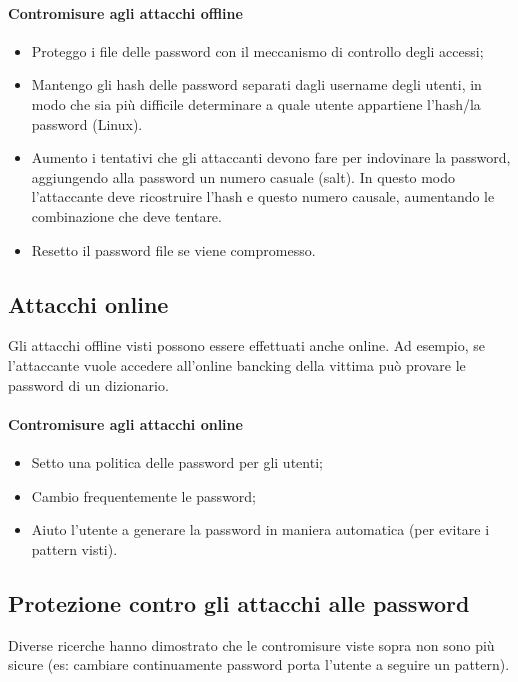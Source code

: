 \paragraph{Contromisure agli attacchi offline}
\begin{itemize}
    \item Proteggo i file delle password con il meccanismo di controllo degli accessi;
    \item Mantengo gli hash delle password separati dagli username degli utenti, in modo che sia più difficile determinare a quale utente appartiene l'hash/la password (Linux).
    \item Aumento i tentativi che gli attaccanti devono fare per indovinare la password, aggiungendo alla password un numero casuale (salt). In questo modo l'attaccante deve ricostruire l'hash e questo numero causale, aumentando le combinazione che deve tentare.
    \item Resetto il password file se viene compromesso.
\end{itemize}

\subsection{Attacchi online}
Gli attacchi offline visti possono essere effettuati anche online. Ad esempio, se l'attaccante vuole accedere all'online bancking della vittima può provare le password di un dizionario.

\paragraph{Contromisure agli attacchi online}
\begin{itemize}
    \item Setto una politica delle password per gli utenti;
    \item Cambio frequentemente le password;
    \item Aiuto l'utente a generare la password in maniera automatica (per evitare i pattern visti).
\end{itemize}

\subsection{Protezione contro gli attacchi alle password}

Diverse ricerche hanno dimostrato che le contromisure viste sopra non sono più sicure (es: cambiare continuamente password porta l'utente a seguire un pattern). 

